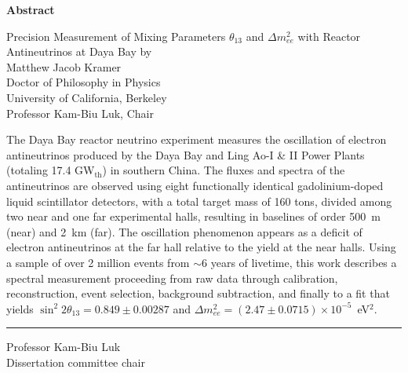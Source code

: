\MyDoubleSpacing

\begin{center}
  \mylarge
  \textbf{Abstract}

  \vspace{1.5\baselineskip}
  Precision Measurement of Mixing Parameters $\theta_{13}$ and $\Delta m^2_{ee}$ with Reactor Antineutrinos at Daya Bay
  \vspace{\baselineskip} by\\
  \vspace{\baselineskip} Matthew Jacob Kramer\\
  Doctor of Philosophy in Physics\\
  University of California, Berkeley\\
  Professor Kam-Biu Luk, Chair
  \vspace{\baselineskip}
\end{center}

\normalsize
\MyDoubleSpacing
\noindent
%
The Daya Bay reactor neutrino experiment measures the oscillation of electron antineutrinos produced by the Daya Bay and Ling Ao-I \& II Power Plants (totaling 17.4 GW$_\mathrm{th}$) in southern China. The fluxes and spectra of the antineutrinos are observed using eight functionally identical gadolinium-doped liquid scintillator detectors, with a total target mass of 160 tons, divided among two near and one far experimental halls, resulting in baselines of order 500~m (near) and 2~km (far). The oscillation phenomenon appears as a deficit of electron antineutrinos at the far hall relative to the yield at the near halls. Using a sample of over 2 million events from $\sim$6 years of livetime, this work describes a spectral measurement proceeding from raw data through calibration, reconstruction, event selection, background subtraction, and finally to a fit that yields $\sin^2 2\theta_{13} = 0.849 \pm 0.00287$ and $\Delta m^2_{ee} = (2.47 \pm 0.0715) \times 10^{-5}$~eV$^2$.
%

\SingleSpacing
\vspace{2.5\baselineskip}
\hfill
\begin{minipage}{0.4\textwidth}
  \hrule\vspace{0.4\baselineskip}
  Professor Kam-Biu Luk\\
  Dissertation committee chair
\end{minipage}

\clearpage